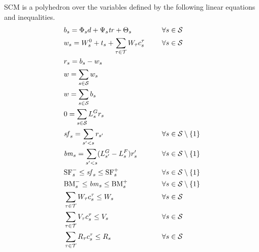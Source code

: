\documentclass[runningheads]{llncs}
\begin{document}
SCM is a polyhedron over the variables defined by the following linear equations and inequalities. 
\begin{alignat}{15}    
                & b_s = \Phi_s d + \Psi_s \mathit{tr} + \Theta_s && \forall s \in \mathcal{S}  \label{eq:constr2}\\
                & w_s = W^0_s + t_s + \sum_{\tau \in \mathcal{T}} W_\tau c^\tau_s \hspace{5mm} && \forall s \in \mathcal{S}  \label{eq:constr3}\\
                & r_s = b_s - w_s  \label{eq:constr4}\\                
                & w = \sum_{s \in \mathcal{S}} w_s &&   \label{eq:constr5}\\
                & w = \sum_{s \in \mathcal{S}} b_s &&   \label{eq:constr6}\\
                & 0 = \sum_{s \in \mathcal{S}} L^G_s r_s &&   \label{eq:constr7}\\
                & \mathit{sf}_s = \sum_{s' < s} r_{s'} &&  \forall s \in \mathcal{S} \setminus \{1\}  \label{eq:constr8}\\                      
                & \mathit{bm}_s = \sum_{s' < s} (L^G_{s'} - L^F_s) r_s' &&  \forall s \in \mathcal{S} \setminus \{1\}  \label{eq:constr9}\\                      
                & \mathrm{SF}^-_s \leq \mathit{sf}_s \leq \mathrm{SF}^+_s      &&  \forall s \in \mathcal{S} \setminus \{1\}  \label{eq:constrA}\\           
                & \mathrm{BM}^-_s \leq \mathit{bm}_s \leq \mathrm{BM}^+_s      &&  \forall s \in \mathcal{S} \setminus \{1\}  \label{eq:constrB}\\           
                & \sum_{\tau \in \mathcal{T}} W_\tau c^\tau_s \leq W_s &&  \forall s \in \mathcal{S} \label{eq:constr10}\\    
                & \sum_{\tau \in \mathcal{T}} V_\tau c^\tau_s \leq V_s &&  \forall s \in \mathcal{S} \label{eq:constr11}\\    
                & \sum_{\tau \in \mathcal{T}} R_\tau c^\tau_s \leq R_s &&  \forall s \in \mathcal{S} \label{eq:constr12}
\end{alignat}
\normalsize
\end{document}
